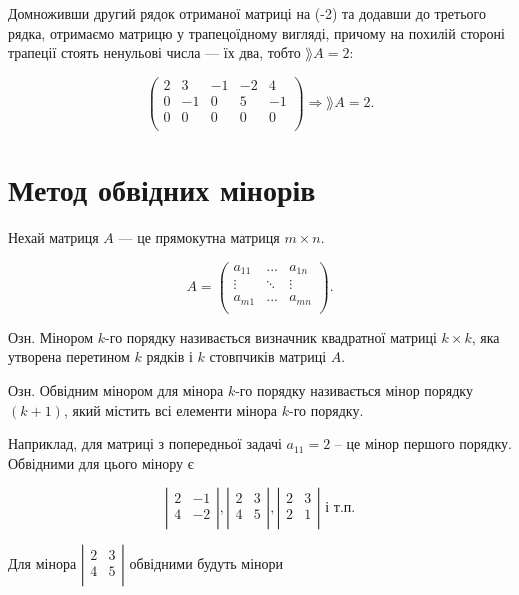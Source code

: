 Домноживши другий рядок отриманої матриці на (-2) та додавши до третього
рядка, отримаємо матрицю у трапецоїдному вигляді, причому на похилій стороні
трапеції стоять ненульові числа --- їх два, тобто $\rang A = 2$:

$$\begin{pmatrix}
	2 &  3 & -1 & -2 &  4 \\
	0 & -1 &  0 &  5 & -1 \\
	0 &  0 &  0 &  0 &  0 \\
\end{pmatrix} \Rightarrow \rang A = 2.$$

\section{Метод обвідних мінорів}

Нехай матриця $A$ --- це прямокутна матриця $m \times n$.

$$A = \begin{pmatrix}
	a_{11} & ...    & a_{1n} \\
	\vdots & \ddots & \vdots \\
	a_{m1} & ...    & a_{mn} \\
\end{pmatrix}.$$


Озн. Мінором $k$-го порядку називається визначник квадратної матриці $k \times k$,
яка утворена перетином $k$ рядків і $k$ стовпчиків матриці $A$.


Озн. Обвідним мінором для мінора $k$-го порядку називається мінор порядку
$(k + 1)$, який містить всі елементи мінора $k$-го порядку.


Наприклад, для матриці з попередньої задачі $a_{11} = 2$ – це мінор першого
порядку. Обвідними для цього мінору є

$$\left| \begin{matrix}
	2 & -1 \\
	4 & -2 \\
\end{matrix} \right|, \left| \begin{matrix}
	2 & 3 \\
	4 & 5 \\
\end{matrix} \right|, \left| \begin{matrix}
	2 & 3 \\
	2 & 1 \\
\end{matrix} \right| \text{ і т.п.}$$


Для мінора $\left| \begin{matrix}
	2 & 3 \\
	4 & 5 \\
\end{matrix} \right|$ обвідними будуть мінори

